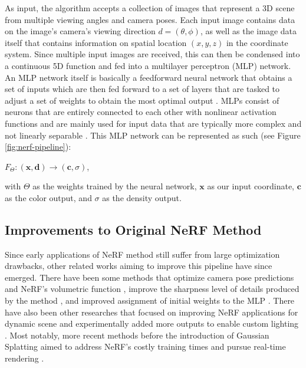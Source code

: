 As input, the algorithm accepts a collection of images that represent a 3D scene from multiple viewing angles and camera poses. Each input image contains data on the image's camera's viewing direction \(d = (\theta, \phi)\), as well as the image data itself that contains information on spatial location \((x, y, z)\) in the coordinate system. Since multiple input images are received, this can then be condensed into a continuous 5D function and fed into a multilayer perceptron (MLP) network. An MLP network itself is basically a feedforward neural network that obtains a set of inputs which are then fed forward to a set of layers that are tasked to adjust a set of weights to obtain the most optimal output \parencite{feedforward}. MLPs consist of neurons that are entirely connected to each other with nonlinear activation functions and are mainly used for input data that are typically more complex and not linearly separable \parencite{mlp}. This MLP network can be represented as such (see Figure \ref{fig:nerf-pipeline}):

\begin{center}
    \(F_\Theta: (\mathbf{x, d}) \rightarrow (\mathbf{c}, \sigma)\),
\end{center}
with \(\Theta\) as the weights trained by the neural network, \(\mathbf{x}\) as our input coordinate, \(\mathbf{c}\) as the color output, and \(\sigma\) as the density output.

\subsection{Improvements to Original NeRF Method}

Since early applications of NeRF method still suffer from large optimization drawbacks, other related works aiming to improve this pipeline have since emerged. There have been some methods that optimize camera pose predictions and NeRF's volumetric function \parencite{BARF}, improve the sharpness level of details produced by the method \parencite{mipnerf}, and improved assignment of initial weights to the MLP \parencite{learned-init}. There have also been other researches that focused on improving NeRF applications for dynamic scene \parencite{nerfw} and experimentally added more outputs to enable custom lighting \parencite{relight}. Most notably, more recent methods before the introduction of Gaussian Splatting aimed to address NeRF's costly training times and pursue real-time rendering \parencite{plenoctrees} \parencite{snerg} \parencite{inerf}.

